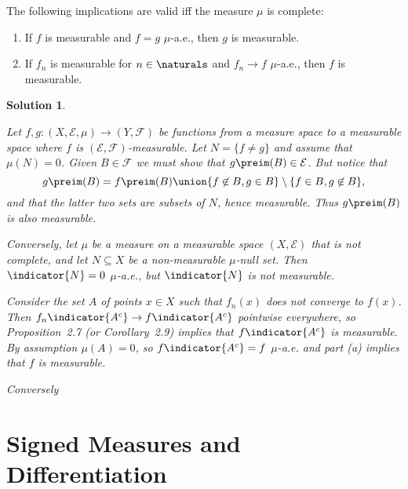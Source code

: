 \documentclass[article, a4paper, 11pt, oneside]{memoir}
\numberwithin{equation}{chapter}
\newcommand{\calE}{\mathcal{E}}
\newcommand{\calF}{\mathcal{F}}
\theoremstyle{nonumberplain}
\newtheorem{solution}{Solution}
\begin{document}
\begin{exerciseframed*}[10]
    The following implications are valid iff the measure $\mu$ is complete:
    \begin{enumerate}
        \item If $f$ is measurable and $f = g$ $\mu$-a.e., then $g$ is measurable.
        \item If $f_n$ is measurable for $n \in \naturals$ and $f_n \to f$ $\mu$-a.e., then $f$ is measurable.
    \end{enumerate}
\end{exerciseframed*}

\begin{solution}
\begin{solutionsec}
    \item Let $f,g \colon (X,\calE,\mu) \to (Y,\calF)$ be functions from a measure space to a measurable space where $f$ is $(\calE,\calF)$-measurable. Let $N = \{f \neq g\}$ and assume that $\mu(N) = 0$. Given $B \in \calF$ we must show that $g\preim(B) \in \calE$. But notice that
    \begin{equation*}
        g\preim(B)
            = f\preim(B) \union \{ f \not\in B, g \in B \} \setminus \{ f \in B, g \not\in B \},
    \end{equation*}
    and that the latter two sets are subsets of $N$, hence measurable. Thus $g\preim(B)$ is also measurable.

    Conversely, let $\mu$ be a measure on a measurable space $(X,\calE)$ that is not complete, and let $N \subseteq X$ be a non-measurable $\mu$-null set. Then $\indicator{N} = 0$ $\mu$-a.e., but $\indicator{N}$ is not measurable.

    \item Consider the set $A$ of points $x \in X$ such that $f_n(x)$ does not converge to $f(x)$. Then $f_n \indicator{A^c} \to f \indicator{A^c}$ pointwise everywhere, so Proposition~2.7 (or Corollary~2.9) implies that $f \indicator{A^c}$ is measurable. By assumption $\mu(A) = 0$, so $f \indicator{A^c} = f$ $\mu$-a.e. and part (a) implies that $f$ is measurable.
    
    Conversely
\end{solutionsec}
\end{solution}


\chapter{Signed Measures and Differentiation}
\end{document}
